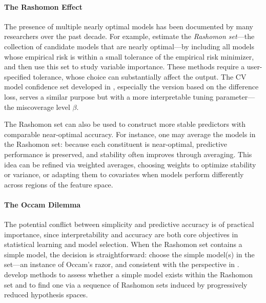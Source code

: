 \documentclass[11pt]{article}
\theoremstyle{plain}
\begin{document}
\paragraph{The Rashomon Effect}  
The presence of multiple nearly optimal models has been documented by many researchers over the past decade. For example, \cite{nevo2017identifying,fisher2019all} estimate the \emph{Rashomon set}---the collection of candidate models that are nearly optimal---by including all models whose empirical risk is within a small tolerance of the empirical risk minimizer, and then use this set to study variable importance. These methods require a user-specified tolerance, whose choice can substantially affect the output. The CV model confidence set developed in , especially the version based on the difference loss, serves a similar purpose but with a more interpretable tuning parameter---the miscoverage level \(\beta\).

The Rashomon set can also be used to construct more stable predictors with comparable near-optimal accuracy. For instance, one may average the models in the Rashomon set: because each constituent is near-optimal, predictive performance is preserved, and stability often improves through averaging. This idea can be refined via weighted averages, choosing weights to optimize stability or variance, or adapting them to covariates when models perform differently across regions of the feature space.

\paragraph{The Occam Dilemma}
The potential conflict between simplicity and predictive accuracy is of practical importance, since interpretability and accuracy are both core objectives in statistical learning and model selection. When the Rashomon set contains a simple model, the decision is straightforward: choose the simple model(s) in the set---an instance of Occam’s razor, and consistent with the perspective in . \cite{semenova2022existence,semenova2023path} develop methods to assess whether a simple model exists within the Rashomon set and to find one via a sequence of Rashomon sets induced by progressively reduced hypothesis spaces.
\end{document}
